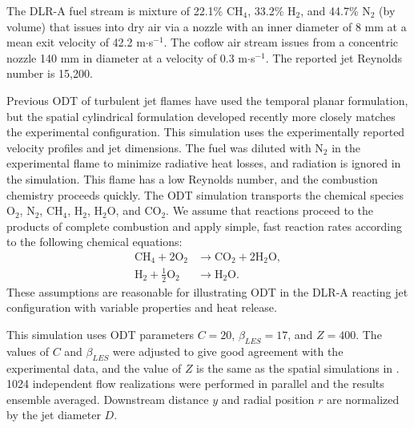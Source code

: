 \documentclass[preprint,12pt, a4paper]{elsarticle}
\begin{document}
The DLR-A fuel stream is mixture of 22.1\% CH$_4$, 33.2\% H$_2$, and 44.7\% N$_2$ (by volume) that issues into dry air via a nozzle with an inner diameter of 8 mm at a mean exit velocity of 42.2 m$\cdot$s$^{-1}$. The coflow air stream issues from a concentric nozzle 140 mm in diameter at a velocity of 0.3 m$\cdot$s$^{-1}$. The reported jet Reynolds number is 15,200.

Previous ODT   of turbulent jet flames have used the temporal planar formulation, but the spatial cylindrical formulation developed recently \cite{Lignell_2018} more closely matches the experimental configuration. This simulation uses the experimentally reported velocity profiles and jet dimensions.  
The fuel was diluted with N$_2$ in the experimental flame to minimize radiative heat losses, and radiation is ignored in the simulation. This flame has a low Reynolds number, and the combustion chemistry proceeds quickly. The ODT simulation transports the chemical species O$_2$, N$_2$, CH$_4$, H$_2$, H$_2$O, and CO$_2$. We assume that reactions proceed to the products of complete combustion and apply simple, fast reaction rates according to the following chemical equations:
\begin{align}
	\mathrm{CH}_4 + 2\mathrm{O}_2 & \rightarrow \mathrm{CO}_2 + 2\mathrm{H}_2\mathrm{O}, \\
	\mathrm{H}_2+\frac{1}{2}\mathrm{O}_2 & \rightarrow \mathrm{H}_2\mathrm{O}.
\end{align}
These assumptions are reasonable for illustrating ODT in the DLR-A reacting jet configuration with variable properties and heat release. 

This simulation uses ODT parameters $C=20$, $\beta_{LES}=17$, and $Z=400$. The values of $C$ and $\beta_{LES}$ were adjusted to give good agreement with the experimental data, and the value of $Z$ is the same as the spatial simulations in \cite{Monson_2016}. 1024 independent flow realizations were performed in parallel and the results ensemble averaged. Downstream distance $y$ and radial position $r$ are normalized by the jet diameter $D$.
\end{document}
